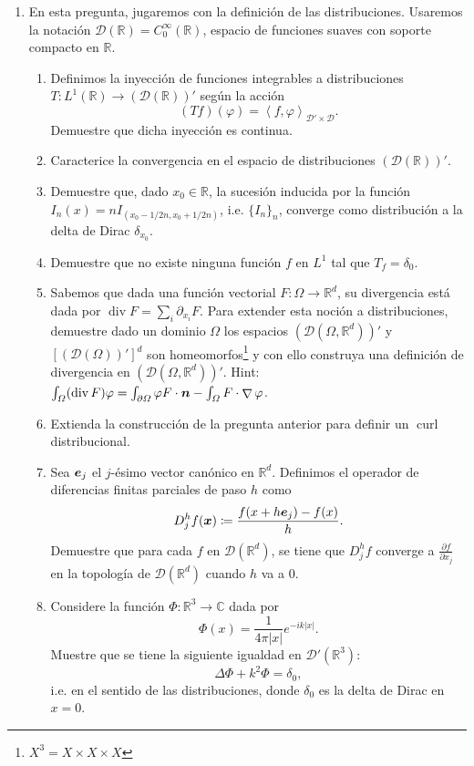 \documentclass{article}
\renewcommand{\vec}{\vectorsym}
\DeclareMathOperator{\grad}{\nabla}
\DeclareMathOperator{\dive}{\text{div}}
\DeclareMathOperator{\curl}{\text{curl}}
\newcommand{\R}{\mathbb{R}}
\newcommand{\pts}[1]{[{\bf #1 puntos}] }
\begin{document}
\begin{enumerate}
    \item En esta pregunta, jugaremos con la definición de las distribuciones. Usaremos la notación $\mathcal D(\R) = C_0^\infty(\R)$, espacio de funciones suaves con soporte compacto en $\R$.
        \begin{enumerate}
            \item\pts{1} Definimos la inyección de funciones integrables a distribuciones $T:L^1(\R) \to \left(\mathcal D(\R)\right)'$ según la acción
                $$ (Tf)(\varphi)  = \left\langle f, \varphi\right\rangle_{\mathcal D'\times \mathcal D}.$$
                Demuestre que dicha inyección es continua. 
            \item\pts{1}Caracterice la convergencia en el espacio de distribuciones $\left(\mathcal D(\R)\right)'$. 
            \item\pts{1}Demuestre que, dado $x_0\in \R$,  la sucesión inducida por la función $I_n(x) = nI_{(x_0-1/2n, x_0+1/2n)}$, i.e. $\{I_n\}_n$, converge como distribución a la delta de Dirac $\delta_{x_0}$. 
            \item\pts{1}Demuestre que no existe ninguna función $f$ en $L^1$ tal que $T_f = \delta_0$. 
            \item\pts{2} Sabemos que dada una función vectorial $F:\Omega \to \R^d$, su divergencia está dada por $\dive F=\sum_i \partial_{x_i}F$. Para extender esta noción a distribuciones, demuestre dado un dominio $\Omega$ los espacios $(\mathcal D(\Omega, \R^d))'$ y $[(\mathcal D(\Omega))']^d$ son homeomorfos\footnote{$X^3 = X\times X\times X$} y con ello construya una definición de divergencia en $(\mathcal D(\Omega, \R^d))'$. Hint: $\int_\Omega (\dive F)\varphi = \int_{\partial\Omega} \varphi F\cdot \vec n - \int_\Omega F\cdot \grad \varphi$. 
            \item\pts{2} Extienda la construcción de la pregunta anterior para definir un $\curl$ distribucional.
            \item\pts{2} Sea $\vec e_j$ el $j$-ésimo vector canónico en $\R^d$. Definimos el operador de diferencias finitas parciales de paso $h$ como
                $$ D_j^hf(\vec x) \coloneqq \frac{f(x+h\vec e_j) - f(x)}{h}. $$
                Demuestre que para cada $f$ en $\mathcal D(\R^d)$, se tiene que $D_j^hf $ converge a $\frac{\partial f}{\partial x_j}$ en la topología de $\mathcal D(\R^d)$ cuando $h$ va a 0.  
            \item\pts{2} Considere la función $\Phi:\R^3\to \mathbb C$ dada por
                    $$ \Phi(x) = \frac{1}{4\pi|x|} e^{-ik |x|}. $$
                Muestre que se tiene la siguiente igualdad en $\mathcal D'(\R^3)$:
                        $$ \Delta \Phi + k^2 \Phi = \delta_0, $$
                i.e. en el sentido de las distribuciones, donde $\delta_0$ es la delta de Dirac en $x=0$. 
        \end{enumerate}
\end{enumerate}

\end{document}
